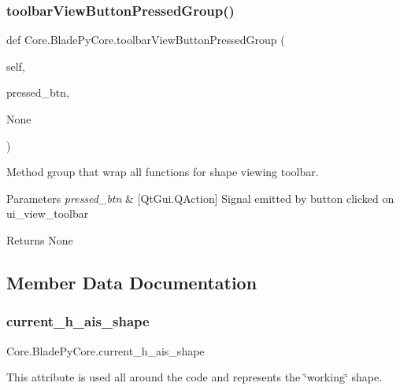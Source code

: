 \subsubsection{\texorpdfstring{toolbar\+View\+Button\+Pressed\+Group()}{toolbarViewButtonPressedGroup()}}
{\footnotesize\ttfamily def Core.\+Blade\+Py\+Core.\+toolbar\+View\+Button\+Pressed\+Group (\begin{DoxyParamCaption}\item[{}]{self,  }\item[{}]{pressed\+\_\+btn,  }\item[{}]{None }\end{DoxyParamCaption})}



Method group that wrap all functions for shape viewing toolbar. 


\begin{DoxyParams}{Parameters}
{\em pressed\+\_\+btn} & \mbox{[}Qt\+Gui.\+Q\+Action\mbox{]} Signal emitted by button clicked on ui\+\_\+view\+\_\+toolbar \\
\hline
\end{DoxyParams}
\begin{DoxyReturn}{Returns}
None 
\end{DoxyReturn}


\subsection{Member Data Documentation}
\hypertarget{a00079_a84a62c3017515ec840e35dbbe8ccbf21}{}\label{a00079_a84a62c3017515ec840e35dbbe8ccbf21} 
\subsubsection{\texorpdfstring{current\+\_\+h\+\_\+ais\+\_\+shape}{current\_h\_ais\_shape}}
{\footnotesize\ttfamily Core.\+Blade\+Py\+Core.\+current\+\_\+h\+\_\+ais\+\_\+shape}



This attribute is used all around the code and represents the \char`\"{}working\char`\"{} shape. 

\hypertarget{a00079_abe828f3ea500c70a4abe0f376b6d8dc4}{}\label{a00079_abe828f3ea500c70a4abe0f376b6d8dc4} 
